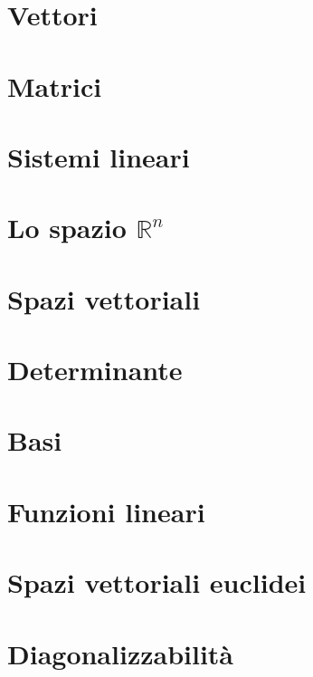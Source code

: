 \documentclass[a4paper,12pt]{article}
\begin{document}
\section{Vettori}
\section{Matrici}
\section{Sistemi lineari}
\section{Lo spazio \(\mathbb R^n\)}
\section{Spazi vettoriali}
\section{Determinante}
\section{Basi}
\section{Funzioni lineari}
\section{Spazi vettoriali euclidei}
\section{Diagonalizzabilità}
\end{document}
